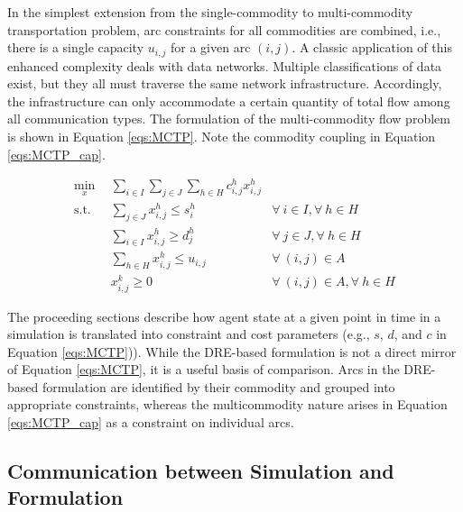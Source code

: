 In the simplest extension from the single-commodity to multi-commodity
transportation problem, arc constraints for all commodities are combined, i.e.,
there is a single capacity $u_{i,j}$ for a given arc $(i, j)$. A classic
application of this enhanced complexity deals with data networks. Multiple
classifications of data exist, but they all must traverse the same network
infrastructure. Accordingly, the infrastructure can only accommodate a certain
quantity of total flow among all communication types. The formulation of the
multi-commodity flow problem is shown in Equation \ref{eqs:MCTP}. Note the
commodity coupling in Equation \ref{eqs:MCTP_cap}.

\begin{subequations}\label{eqs:MCTP}
  \begin{align}
    \min_{x} \:\: & 
    \sum_{i \in I}\sum_{j \in J}\sum_{h \in H} c_{i,j}^{h} x_{i,j}^{h}
    & \label{eqs:MCTP_obj} \\
    \text{s.t.} \:\: &
    \sum_{j \in J} x_{i,j}^{h} \leq s_{i}^{h}
    &
    \forall \: i \in I, \forall \: h \in H \label{eqs:MCTP_sup} \\
    &
    \sum_{i \in I} x_{i,j}^{h} \geq d_{j}^{h}
    & 
    \forall \: j \in J, \forall \: h \in H \label{eqs:MCTP_dem} \\
    &
    \sum_{h \in H} x_{i,j}^{h} \leq u_{i,j}
    & 
    \forall \: (i, j) \in A \label{eqs:MCTP_cap} \\
    &
    x_{i,j}^{k} \geq 0
    &
    \forall \: (i, j) \in A, \forall \: h \in H \label{eqs:MCTP_x}
  \end{align}
\end{subequations}

The proceeding sections describe how agent state at a given point in time in a
simulation is translated into constraint and cost parameters (e.g., $s$, $d$,
and $c$ in Equation \ref{eqs:MCTP})). While the DRE-based formulation is not a
direct mirror of Equation \ref{eqs:MCTP}, it is a useful basis of
comparison. Arcs in the DRE-based formulation are identified by their commodity
and grouped into appropriate constraints, whereas the multicommodity nature
arises in Equation \ref{eqs:MCTP_cap} as a constraint on individual arcs.

\subsection{Communication between Simulation and Formulation}

